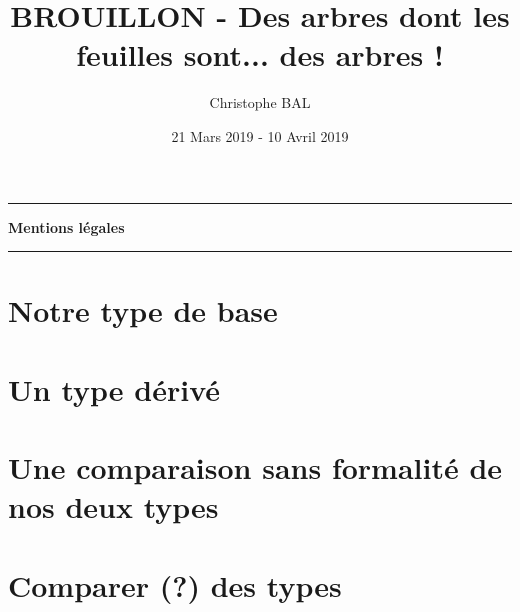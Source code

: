 \documentclass[12pt]{amsart}
\begin{document}
\title{BROUILLON - Des arbres dont les feuilles sont... des arbres !}
\author{Christophe BAL}
\date{21 Mars 2019 - 10 Avril 2019}

\maketitle


\begin{center}
	\hrule\vspace{.3em}
	{
		\fontsize{1.35em}{1em}\selectfont
		\textbf{Mentions \og légales \fg}
	}
			
	\vspace{0.45em}
	\doclicenseThis
	\hrule
\end{center}

\setcounter{tocdepth}{2}
\tableofcontents



\section{Notre type de base}





\section{Un type dérivé}





\section{Une comparaison sans formalité de nos deux types}





\section{Comparer (\!?) des types}


\end{document}
